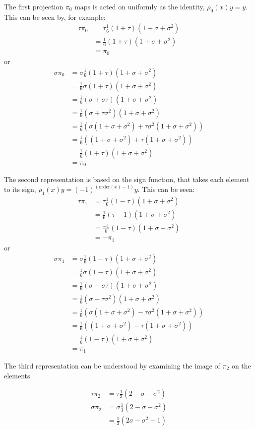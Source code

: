 \documentclass[a5paper]{article}
\renewcommand{\t}{\tau}
\newcommand{\s}{\sigma}
\newcommand{\order}{\text{order}}
\begin{document}
The first projection $\pi_0$ maps is acted on uniformly as
the identity, $\rho_0(x)y = y$. This can be seen by, for example:
\begin{align*}
    \t \pi_0 &= \t\frac{1}{6}(1+\t)(1+\s+\s^2) \\
     &= \frac{1}{6}(1+\t)(1+\s+\s^2) \\
     &= \pi_0
\end{align*}
or
\begin{align*}
    \s \pi_0 &= \s\frac{1}{6}(1+\t)(1+\s+\s^2) \\
     &= \frac{1}{6}\s(1+\t)(1+\s+\s^2) \\
     &= \frac{1}{6}(\s+\s\t)(1+\s+\s^2) \\
     &= \frac{1}{6}(\s+\t\s^2)(1+\s+\s^2) \\
     &= \frac{1}{6}(\s(1+\s+\s^2) +\t\s^2(1+\s+\s^2))\\
     &= \frac{1}{6}((1+\s+\s^2) +\t(1+\s+\s^2))\\
     &= \frac{1}{6}(1+\t)(1+\s+\s^2) \\
     &= \pi_0
\end{align*}

The second representation is based on the sign function, that takes
each element to its sign, $\rho_1(x)y = (-1)^{(\order(x)-1)}y$. This
can be seen:
\begin{align*}
    \t \pi_1 &= \t\frac{1}{6}(1-\t)(1+\s+\s^2) \\
     &= \frac{1}{6}(\t-1)(1+\s+\s^2) \\
     &= \frac{-1}{6}(1-\t)(1+\s+\s^2) \\
     &= -\pi_1
\end{align*}
or
\begin{align*}
    \s \pi_1 &= \s\frac{1}{6}(1-\t)(1+\s+\s^2) \\
     &= \frac{1}{6}\s(1-\t)(1+\s+\s^2) \\
     &= \frac{1}{6}(\s-\s\t)(1+\s+\s^2) \\
     &= \frac{1}{6}(\s-\t\s^2)(1+\s+\s^2) \\
     &= \frac{1}{6}(\s(1+\s+\s^2) - \t\s^2(1+\s+\s^2))\\
     &= \frac{1}{6}((1+\s+\s^2) - \t(1+\s+\s^2))\\
     &= \frac{1}{6}(1-\t)(1+\s+\s^2) \\
     &= \pi_1
\end{align*}

The third representation can be understood by examining the
image of $\pi_2$ on the elements.

\begin{align*}
    \t \pi_2 &= \t\frac{1}{3}(2-\s-\s^2) \\
    \s \pi_2 &= \s\frac{1}{3}(2-\s-\s^2) \\
             &= \frac{1}{3}(2\s-\s^2-1) \\
\end{align*}
\end{document}
